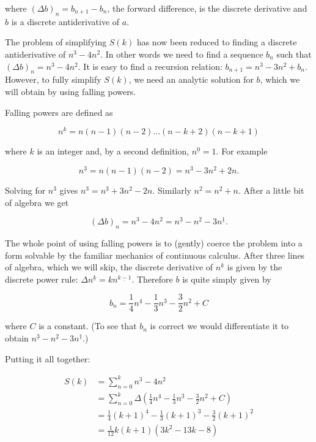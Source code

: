 \documentclass{article}
\begin{document}
\noindent where $(\Delta b)_n = b_{n+1} - b_n$, the forward difference, is the
discrete derivative and $b$ is a discrete antiderivative of $a$.

The problem of simplifying $S(k)$ has now been reduced to finding a discrete
antiderivative of $n^3-4n^2$. In other words we need to find a sequence $b_n$
such that $(\Delta b)_n = n^3-4n^2$. It is easy to find a recursion relation:
$b_{n+1} = n^3-3n^2 + b_n$. However, to fully simplify $S(k)$, we need an
analytic solution for $b$, which we will obtain by using falling powers.

Falling powers are defined as

\[
    n^{\underline{k}} = n(n-1)(n-2)\ldots(n-k+2)(n-k+1)
\]

\noindent where $k$ is an integer and, by a second definition,
$n^{\underline{0}}=1$. For example

\[
    n^{\underline{3}} = n(n-1)(n-2) = n^3-3n^2+2n.
\]

\noindent Solving for $n^3$ gives $n^3 = n^{\underline{3}} + 3n^2-2n$.
Similarly $n^2 = n^{\underline{2}} + n$. After a little bit of algebra we get

\[
(\Delta b)_n=n^3-4n^2=n^{\underline{3}}-n^{\underline{2}}-3n^{\underline{1}}.
\]

The whole point of using falling powers is to (gently) coerce the problem into
a form solvable by the familiar mechanics of continuous calculus.  After three
lines of algebra, which we will skip, the discrete derivative of
$n^{\underline{k}}$ is given by the discrete power rule:
$\Delta n^{\underline{k}}= kn^{\underline{k-1}}$. Therefore $b$ is quite
simply given by

\[
b_n=\frac{1}{4}n^{\underline{4}}-\frac{1}{3}n^{\underline{3}}-\frac{3}{2}n^{\underline{2}}+C
\]

\noindent where $C$ is a constant. (To see that $b_n$ is correct we would
differentiate it to obtain
$n^{\underline{3}}-n^{\underline{2}}-3n^{\underline{1}}.$)

Putting it all together:

\begin{align*}
    S(k) &= \sum\limits_{n=0}^k n^3-4n^2 \\
         &= \sum\limits_{n=0}^k \Delta (\frac{1}{4}n^{\underline{4}}-\frac{1}{3}n^{\underline{3}}-\frac{3}{2}n^{\underline{2}}+C) \\
         &= \frac{1}{4}(k+1)^{\underline{4}}-\frac{1}{3}(k+1)^{\underline{3}}-\frac{3}{2}(k+1)^{\underline{2}} \\
         &= \frac{1}{12}k(k+1)(3k^2-13k-8)
\end{align*}
\end{document}
